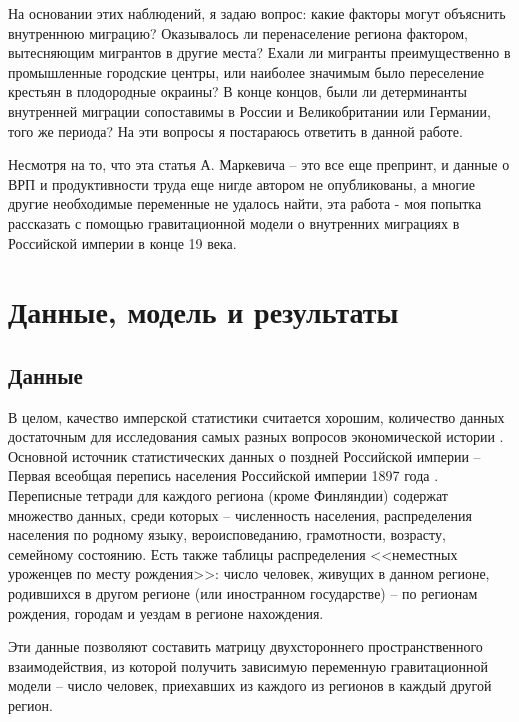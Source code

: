 \documentclass[a4paper,12pt]{article}
\let\oldsection\section
\renewcommand\section{\clearpage\oldsection}
\begin{document}
На основании этих наблюдений, я задаю вопрос: какие факторы могут объяснить внутреннюю миграцию? 
Оказывалось ли перенаселение региона фактором, вытесняющим мигрантов в другие места? Ехали ли мигранты преимущественно в промышленные городские центры, или наиболее значимым было переселение крестьян в плодородные окраины? В конце концов, были ли детерминанты внутренней миграции сопоставимы в России и Великобритании или Германии, того же периода? На эти вопросы я постараюсь ответить в данной работе.

Несмотря на то, что эта статья А. Маркевича -- это все еще препринт, и данные о ВРП и продуктивности труда еще нигде автором не опубликованы, а многие другие необходимые переменные не удалось найти, эта работа - моя попытка рассказать с помощью гравитационной модели о внутренних миграциях в Российской империи в конце 19 века.



\section{Данные, модель и результаты}

\subsection{Данные}\label{sec:data}

В целом, качество имперской статистики считается хорошим, количество данных достаточным для исследования самых разных вопросов экономической истории \citep{markevich_regional_2019}. Основной источник статистических данных о поздней Российской империи – Первая всеобщая перепись населения Российской империи 1897 года \citep{census_1897}. Переписные тетради для каждого региона (кроме Финляндии) содержат множество данных, среди которых – численность населения, распределения населения по родному языку, вероисповеданию, грамотности, возрасту, семейному состоянию. Есть также таблицы распределения <<неместных уроженцев по месту рождения>>: число человек, живущих в данном регионе, родившихся в другом регионе (или иностранном государстве) – по регионам рождения, городам и уездам в регионе нахождения.

Эти данные позволяют составить матрицу двухстороннего пространственного взаимодействия, из которой получить зависимую переменную гравитационной модели -- число человек, приехавших из каждого из регионов в каждый другой регион. 

\end{document}
